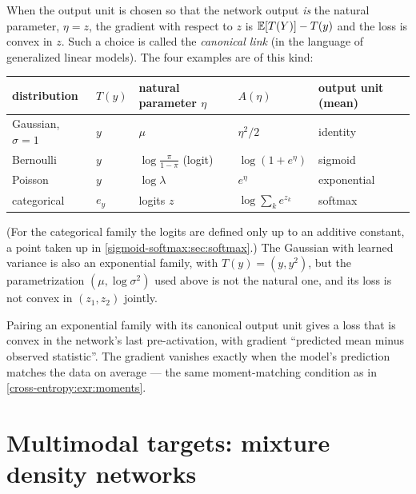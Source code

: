 \begin{notechapter}
When the output unit is chosen so that the network output \emph{is} the natural
parameter, $\eta = z$, the gradient with respect to $z$ is $\mathbb{E}[T(Y)] - T(y)$ and the loss
is convex in $z$. Such a choice is called the \emph{canonical link} (in the language
of generalized linear models). The four examples are of this kind:
\begin{center}
\begin{tabular}{@{}lllll@{}}
\toprule
distribution & $T(y)$ & natural parameter $\eta$ & $A(\eta)$ & output unit (mean) \\
\midrule
Gaussian, $\sigma = 1$ & $y$ & $\mu$ & $\eta^2/2$ & identity \\
Bernoulli & $y$ & $\log\frac\pi{1-\pi}$ (logit) & $\log(1 + e^\eta)$ & sigmoid \\
Poisson & $y$ & $\log\lambda$ & $e^\eta$ & exponential \\
categorical & $e_y$ & logits $z$ & $\log\sum_ke^{z_k}$ & softmax \\
\bottomrule
\end{tabular}
\end{center}
(For the categorical family the logits are defined only up to an additive
constant, a point taken up in \cref{sigmoid-softmax:sec:softmax}.) The Gaussian with
learned variance is also an exponential family, with $T(y) = (y, y^2)$, but the
parametrization $(\mu,\log\sigma^2)$ used above is not the natural one, and its loss is not
convex in $(z_1, z_2)$ jointly.

\begin{keyidea}
Pairing an exponential family with its canonical output unit gives a loss that is
convex in the network's last pre-activation, with gradient
``predicted mean minus observed statistic''. The gradient vanishes exactly when
the model's prediction matches the data on average --- the same moment-matching
condition as in \cref{cross-entropy:exr:moments}.
\end{keyidea}

\section{Multimodal targets: mixture density networks}\label{output-distributions:sec:mdn}


\end{notechapter}

